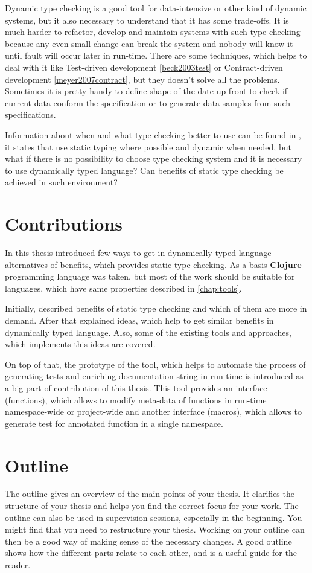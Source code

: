 Dynamic type checking is a good tool for data-intensive or other kind of dynamic
systems, but it also necessary to understand that it has some trade-offs. It is
much harder to refactor, develop and maintain systems with such type checking
because any even small change can break the system and nobody will know it until
fault will occur later in run-time. There are some techniques, which helps to
deal with it like Test-driven development \ref{beck2003test} or Contract-driven
development \ref{meyer2007contract}, but they doesn't solve all the problems.
Sometimes it is pretty handy to define shape of the date up front to check if
current data conform the specification or to generate data samples from such
specifications.

Information about when and what type checking better to use can be found in
\cite{meijer2004static}, it states that use static typing where possible and
dynamic when needed, but what if there is no possibility to choose type checking
system and it is necessary to use dynamically typed language? Can benefits of
static type checking be achieved in such environment?


\section{Contributions}
In this thesis introduced few ways to get in dynamically typed language
alternatives of benefits, which provides static type checking. As a basis
\textbf{Clojure} programming language was taken, but most of the work should be
suitable for languages, which have same properties described in
\ref{chap:tools}.

Initially, described benefits of static type checking and which of them are more
in demand. After that explained ideas, which help to get similar benefits in
dynamically typed language. Also, some of the existing tools and approaches,
which implements this ideas are covered.

On top of that, the prototype of the tool, which helps to automate the process
of generating tests and enriching documentation string in run-time is introduced
as a big part of contribution of this thesis. This tool provides an interface
(functions), which allows to modify meta-data of functions in run-time
namespace-wide or project-wide and another interface (macros), which allows to
generate test for annotated function in a single namespace.

\section{Outline}
The outline gives an overview of the main points of your thesis. It clarifies the structure of your thesis and helps you find the correct focus for your work. The outline can also be used in supervision sessions, especially in the beginning. You might find that you need to restructure your thesis. Working on your outline can then be a good way of making sense of the necessary changes. A good outline shows how the different parts relate to each other, and is a useful guide for the reader.








